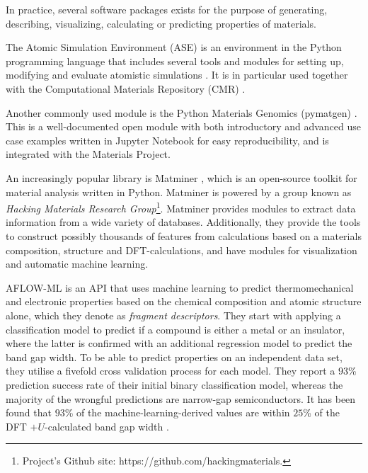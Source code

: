 In practice, several software packages exists for the purpose of generating, describing, visualizing, calculating or predicting properties of materials.

The Atomic Simulation Environment (ASE) is an environment in the Python programming language that includes several tools and modules for setting up, modifying and evaluate atomistic simulations \cite{Larsen2017}. It is in particular used together with the Computational Materials Repository (CMR) \cite{Landis2012}.

Another commonly used module is the Python Materials Genomics (pymatgen) \cite{Ong2013}. This is a well-documented open module with both introductory and advanced use case examples written in Jupyter Notebook for easy reproducibility, and is integrated with the Materials Project. %

An increasingly popular library is Matminer \cite{Ward2018}, which is an open-source toolkit for material analysis written in Python. Matminer is powered by a group known as \textit{Hacking Materials Research Group}\footnote{Project's Github site: https://github.com/hackingmaterials.}. Matminer provides modules to extract data information from a wide variety of databases. Additionally, they provide the tools to construct possibly thousands of features from calculations based on a materials composition, structure and DFT-calculations, and have modules for visualization and automatic machine learning.

AFLOW-ML \cite{Isayev2017} is an API that uses machine learning to predict thermomechanical and electronic properties based on the chemical composition and atomic structure alone, which they denote as \textit{fragment descriptors}. They start with applying a classification model to predict if a compound is either a metal or an insulator, where the latter is confirmed with an additional regression model to predict the band gap width. To be able to predict properties on an independent data set, they utilise a fivefold cross validation process for each model. They report a $93$\% prediction success rate of their initial binary classification model, whereas the majority of the wrongful predictions are narrow-gap semiconductors. It has been found that $93$\% of the machine-learning-derived values are within $25$\% of the DFT $+U$-calculated band gap width \cite{Ferrenti2020}.


